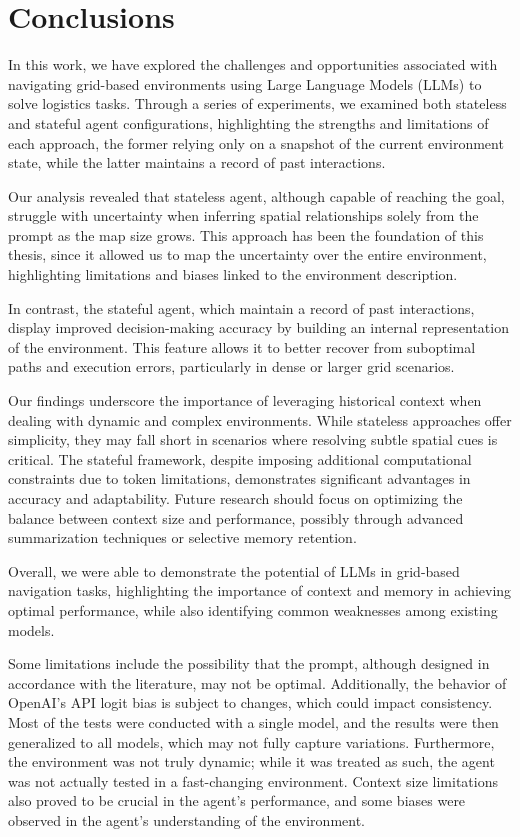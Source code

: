 \chapter{Conclusions}
\label{cha:conclusions}

In this work, we have explored the challenges and opportunities associated with navigating
grid-based environments using Large Language Models (LLMs) to solve logistics tasks.
Through a series of experiments, we examined both stateless and stateful agent configurations,
highlighting the strengths and limitations of each approach, the former relying only
on a snapshot of the current environment state, while the latter maintains a
record of past interactions.

Our analysis revealed that stateless agent, although capable of reaching the goal,
struggle with uncertainty when inferring spatial relationships solely from the
prompt as the map size grows. This approach has been the foundation of this thesis,
since it allowed us to map the uncertainty over the entire environment, highlighting
limitations and biases linked to the environment description.

In contrast, the stateful agent, which maintain a record of past interactions,
display improved decision-making accuracy by building an internal representation
of the environment. This feature allows it to better recover from suboptimal paths
and execution errors, particularly in dense or larger grid scenarios.

Our findings underscore the importance of leveraging historical context when
dealing with dynamic and complex environments. While stateless approaches offer simplicity,
they may fall short in scenarios where resolving subtle spatial cues is critical.
The stateful framework, despite imposing additional computational constraints
due to token limitations, demonstrates significant advantages in accuracy and adaptability.
Future research should focus on optimizing the balance between context size and
performance, possibly through advanced summarization techniques or selective memory
retention.

Overall, we were able to demonstrate the potential of LLMs in grid-based
navigation tasks, highlighting the importance of context and memory in achieving
optimal performance, while also identifying common weaknesses among existing
models.

\vspace{1mm}
Some limitations include the possibility that the prompt, although designed in accordance
with the literature, may not be optimal. Additionally, the behavior of OpenAI's
API logit bias is subject to changes, which could impact consistency. Most of
the tests were conducted with a single model, and the results were then generalized
to all models, which may not fully capture variations. Furthermore, the
environment was not truly dynamic; while it was treated as such, the agent was
not actually tested in a fast-changing environment. Context size limitations also
proved to be crucial in the agent's performance, and some biases were observed
in the agent's understanding of the environment.
\vspace{1mm}

